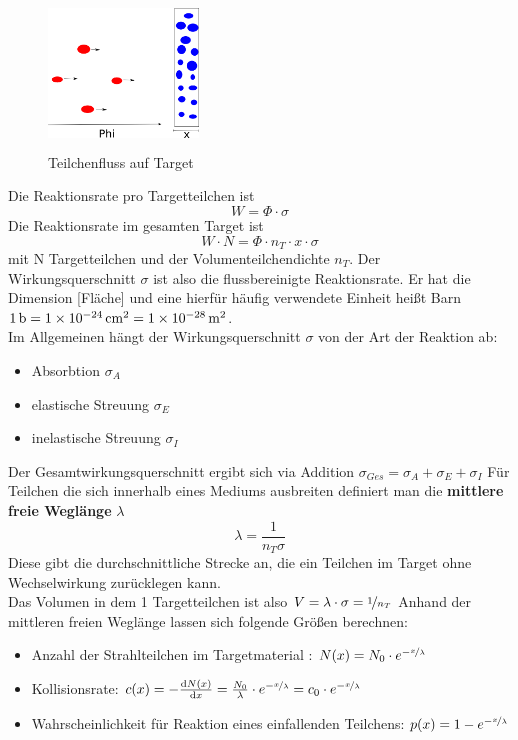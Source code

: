 \documentclass[Ex4_Zusammenfassung.tex]{subfiles}
\begin{document}
\begin{figure}[h]
	\centering
	\includegraphics[height= 4cm, width=4cm]{fluss.png}
	\caption{Teilchenfluss auf Target}
\end{figure}
Die Reaktionsrate pro Targetteilchen ist 
\begin{equation}
	W = \Phi \cdot \sigma 
\end{equation}
Die Reaktionsrate im gesamten Target ist
\begin{equation}
	W \cdot N = \Phi \cdot n_{T} \cdot x \cdot \sigma 
\end{equation}
mit N Targetteilchen und der Volumenteilchendichte $ n_T $. Der Wirkungsquerschnitt $\sigma$ ist also die flussbereinigte Reaktionsrate. Er hat die Dimension [Fläche] und eine hierfür häufig verwendete Einheit heißt Barn $\SI{1}{b} = \SI{1E-24}{cm^2} = \SI{1E-28}{m^2}$.\\

Im Allgemeinen hängt der Wirkungsquerschnitt  $ \sigma $ von der Art der Reaktion ab: 
\begin{itemize}
\item Absorbtion $ \sigma_{A} $
\item elastische Streuung $ \sigma_{E} $
\item inelastische Streuung $ \sigma_{I} $
\end{itemize}
Der Gesamtwirkungsquerschnitt ergibt sich via Addition $ \sigma_{Ges} = \sigma_{A} + \sigma_{E} + \sigma_{I}  $ \newline
Für Teilchen die sich innerhalb eines Mediums ausbreiten definiert man die \textbf{mittlere freie Weglänge} $\lambda$
\begin{equation}
	\lambda = \frac{1}{n_T \sigma}
\end{equation} 
Diese gibt die durchschnittliche Strecke an, die ein Teilchen im Target ohne Wechselwirkung zurücklegen kann. \\

Das Volumen in dem 1 Targetteilchen ist also $ V = \lambda \cdot \sigma = \nicefrac{1}{n_T} $  \newline
Anhand der mittleren freien Weglänge lassen sich folgende Größen berechnen: 
\begin{itemize}
	\item Anzahl der Strahlteilchen im Targetmaterial : $ N(x) = N_{0} \cdot e^{-\nicefrac{x}{\lambda}} $
	\item Kollisionsrate: $ c(x) = - \frac{\mathrm{d} N(x)}{\mathrm{d} x} = \frac{N_{0}}{\lambda} \cdot e^{-\nicefrac{x}{\lambda}} = c_0 \cdot e^{-\nicefrac{x}{\lambda}} $
	\item Wahrscheinlichkeit für Reaktion eines einfallenden Teilchens: $  p(x) = 1- e^{-\nicefrac{x}{\lambda}} $
\end{itemize}
\end{document}
